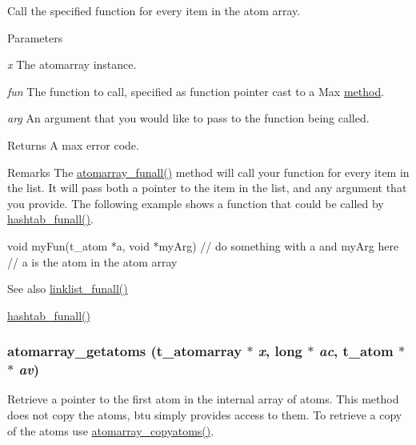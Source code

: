 Call the specified function for every item in the atom array. 
\begin{DoxyParams}{Parameters}
\item[{\em x}]The atomarray instance. \item[{\em fun}]The function to call, specified as function pointer cast to a Max \hyperlink{group__datatypes_gac26ba0a173b50597f5738132e059b42d}{method}. \item[{\em arg}]An argument that you would like to pass to the function being called. \end{DoxyParams}
\begin{DoxyReturn}{Returns}
A max error code.
\end{DoxyReturn}
\begin{DoxyRemark}{Remarks}
The \hyperlink{group__atomarray_gacfb767a18f14fb13a0952c6ed7903de1}{atomarray\_\-funall()} method will call your function for every item in the list. It will pass both a pointer to the item in the list, and any argument that you provide. The following example shows a function that could be called by \hyperlink{group__hashtab_ga37e7b5c20c9fc69e9435f788f35335dc}{hashtab\_\-funall()}. 
\begin{DoxyCode}
    void myFun(t_atom *a, void *myArg)
    {
        // do something with a and myArg here
        // a is the atom in the atom array
    }
\end{DoxyCode}

\end{DoxyRemark}
\begin{DoxySeeAlso}{See also}
\hyperlink{group__linklist_ga6f4496ef6dc1d6d121acf25d7cd5f946}{linklist\_\-funall()} 

\hyperlink{group__hashtab_ga37e7b5c20c9fc69e9435f788f35335dc}{hashtab\_\-funall()} 
\end{DoxySeeAlso}
\hypertarget{group__atomarray_ga28824a30f15ddaec8b1a323f285fbe85}{
\subsubsection[{atomarray\_\-getatoms}]{ atomarray\_\-getatoms ({\bf t\_\-atomarray} $\ast$ {\em x}, \/  long $\ast$ {\em ac}, \/  {\bf t\_\-atom} $\ast$$\ast$ {\em av})}}
\label{group__atomarray_ga28824a30f15ddaec8b1a323f285fbe85}


Retrieve a pointer to the first atom in the internal array of atoms. This method does not copy the atoms, btu simply provides access to them. To retrieve a copy of the atoms use \hyperlink{group__atomarray_gaec25ec428f6bb7b1a1c8092b5c01f2c2}{atomarray\_\-copyatoms()}.


